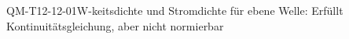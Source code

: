 
\begin{EXA}{QM-T12-12-01}{W-keitsdichte und Stromdichte für ebene Welle: Erfüllt Kontinuitätsgleichung, aber nicht normierbar}
\end{EXA}
